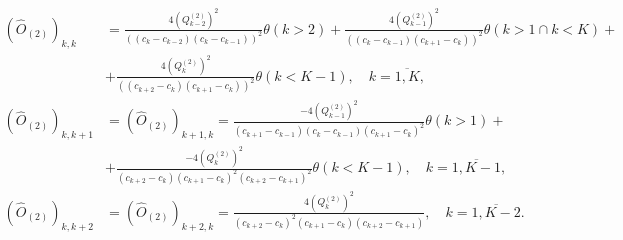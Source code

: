 \documentclass[]{article}
\begin{document}
\begin{align}
    (\hat O_{(2)})_{k,k} &=
    \frac{4 (Q^{(2)}_{k-2})^2}{((c_k - c_{k-2})(c_k - c_{k-1}))^2}\theta(k>2) +
    \frac{4 (Q^{(2)}_{k-1})^2}{((c_k - c_{k-1})(c_{k+1} - c_{k}))^2}\theta(k>1 \cap k<K) \nonumber +\\&+
    \frac{4 (Q^{(2)}_k)^2}{((c_{k+2} - c_k)(c_{k+1} - c_k))^2}\theta(k<K-1),
    \quad k=\overline{1,K},\\
    (\hat O_{(2)})_{k,k+1} &= (\hat O_{(2)})_{k+1,k} =
    \frac{-4(Q^{(2)}_{k-1})^2}{(c_{k+1} - c_{k-1})(c_k - c_{k-1})(c_{k+1} - c_k)^2}\theta(k>1) \nonumber +\\&+
    \frac{-4(Q^{(2)}_k)^2}{(c_{k+2} - c_k)(c_{k+1} - c_k)^2(c_{k+2} - c_{k+1})^2}\theta(k<K-1),
    \quad k=\overline{1,K-1},\\
    (\hat O_{(2)})_{k,k+2} &= (\hat O_{(2)})_{k+2,k} =
    \frac{4(Q^{(2)}_{k})^2}{(c_{k+2} - c_{k})^2(c_{k+1} - c_k)(c_{k+2} - c_{k+1})}, \quad k=\overline{1,K-2}.
\end{align}
\end{document}
